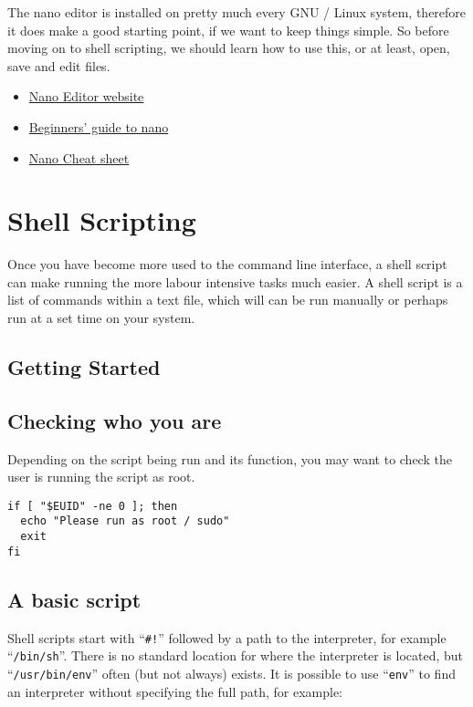 \documentclass{book}
\newcommand\youtube[2]{\href{https://invidious.snopyta.org/watch?v=#1}{#2}}
\begin{document}
The nano editor is installed on pretty much every GNU / Linux system, therefore it does make a good starting point, if we want to keep things simple. So before moving on to shell scripting, we should learn how to use this, or at least, open, save and edit files.

\begin{itemize}
\item \href{https://www.nano-editor.org/}{Nano Editor website}
\item \youtube{cLyUZAabf40}{Beginners' guide to nano}
\item \href{https://www.nano-editor.org/dist/latest/cheatsheet.html}{Nano Cheat sheet}

\end{itemize}

\section{Shell Scripting}

Once you have become more used to the command line interface, a shell script can make running the more labour intensive tasks much easier. A shell script is a list of commands within a text file, which will can be run manually or perhaps run at a set time on your system.

\subsection{Getting Started}


\subsection{Checking who you are}

Depending on the script being run and its function, you may want to check the user is running the script as root.

\begin{verbatim}
if [ "$EUID" -ne 0 ]; then
  echo "Please run as root / sudo"
  exit
fi
\end{verbatim}

\subsection{A basic script}

Shell scripts start with ``\verb|#!|'' followed by a path to the interpreter, for example ``\verb|/bin/sh|''.
There is no standard location for where the interpreter is located, but ``\verb|/usr/bin/env|'' often (but not always) exists.
It is possible to use ``\verb|env|'' to find an interpreter without specifying the full path, for example:
\end{document}
